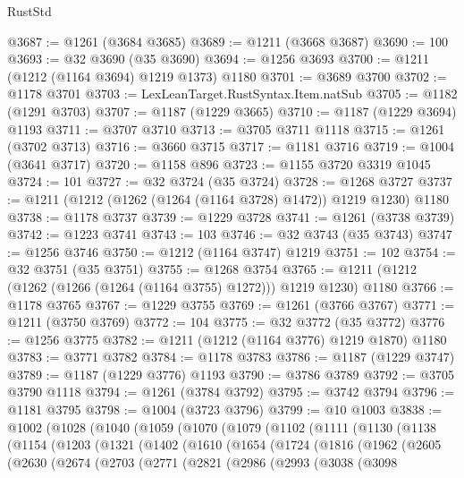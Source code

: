 \begin{lexlean}{RustStd}
\begin{coremodule}
@3687 := @1261 (@3684 @3685)
@3689 := @1211 (@3668 @3687)
@3690 := 100
@3693 := @32 @3690 (@35 @3690)
@3694 := @1256 @3693
@3700 := @1211 (@1212 (@1164 @3694) @1219 @1373) @1180
@3701 := @3689 @3700
@3702 := @1178 @3701
@3703 := LexLeanTarget.RustSyntax.Item.natSub
@3705 := @1182 (@1291 @3703)
@3707 := @1187 (@1229 @3665)
@3710 := @1187 (@1229 @3694) @1193
@3711 := @3707 @3710
@3713 := @3705 @3711 @1118
@3715 := @1261 (@3702 @3713)
@3716 := @3660 @3715
@3717 := @1181 @3716
@3719 := @1004 (@3641 @3717)
@3720 := @1158 @896
@3723 := @1155 @3720 @3319 @1045
@3724 := 101
@3727 := @32 @3724 (@35 @3724)
@3728 := @1268 @3727
@3737 := @1211 (@1212 (@1262 (@1264 (@1164 @3728) @1472)) @1219 @1230) @1180
@3738 := @1178 @3737
@3739 := @1229 @3728
@3741 := @1261 (@3738 @3739)
@3742 := @1223 @3741
@3743 := 103
@3746 := @32 @3743 (@35 @3743)
@3747 := @1256 @3746
@3750 := @1212 (@1164 @3747) @1219
@3751 := 102
@3754 := @32 @3751 (@35 @3751)
@3755 := @1268 @3754
@3765 := @1211 (@1212 (@1262 (@1266 (@1264 (@1164 @3755) @1272))) @1219 @1230) @1180
@3766 := @1178 @3765
@3767 := @1229 @3755
@3769 := @1261 (@3766 @3767)
@3771 := @1211 (@3750 @3769)
@3772 := 104
@3775 := @32 @3772 (@35 @3772)
@3776 := @1256 @3775
@3782 := @1211 (@1212 (@1164 @3776) @1219 @1870) @1180
@3783 := @3771 @3782
@3784 := @1178 @3783
@3786 := @1187 (@1229 @3747)
@3789 := @1187 (@1229 @3776) @1193
@3790 := @3786 @3789
@3792 := @3705 @3790 @1118
@3794 := @1261 (@3784 @3792)
@3795 := @3742 @3794
@3796 := @1181 @3795
@3798 := @1004 (@3723 @3796)
@3799 := @10 @1003
@3838 := @1002
    (@1028
      (@1040
        (@1059
          (@1070
            (@1079
              (@1102
                (@1111
                  (@1130
                    (@1138
                      (@1154
                        (@1203
                          (@1321
                            (@1402
                              (@1610
                                (@1654
                                  (@1724
                                    (@1816
                                      (@1962
                                        (@2605
                                          (@2630
                                            (@2674
                                              (@2703
                                                (@2771
                                                  (@2821
                                                    (@2986
                                                      (@2993
                                                        (@3038
                                                          (@3098

\end{coremodule}
\end{lexlean}
